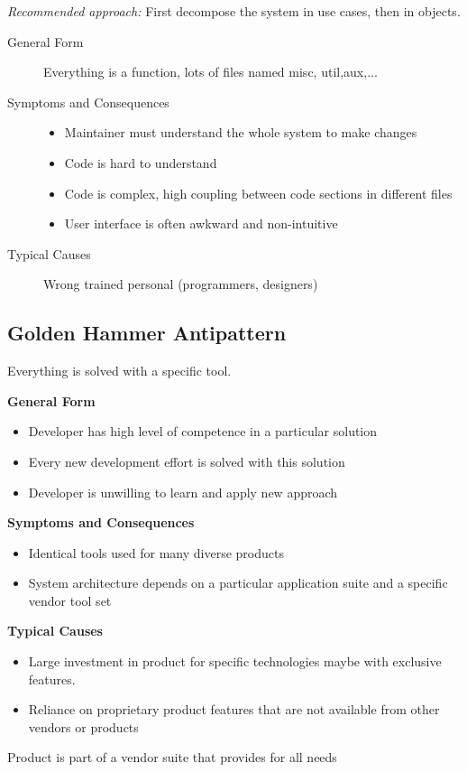 \textit{Recommended approach:} First decompose the system in use cases, then in objects.

\begin{description}
  \item[General Form] Everything is a function, lots of files named misc, util,aux,...
  \item[Symptoms and Consequences] \hfill
  \begin{itemize}
    \item Maintainer must understand the whole system to make changes
     \item Code is hard to understand
     \item Code is complex, high coupling between code sections in different files
     \item User interface is often awkward and non-intuitive
  \end{itemize}
  \item[Typical Causes] Wrong trained personal (programmers, designers)
\end{description}
\newpage

\subsection{Golden Hammer Antipattern}
Everything is solved with a specific tool.
\begin{description}
	\item \textbf{General Form}
	\begin{itemize}
		\item Developer has high level of competence in a particular solution
	    \item Every new development effort is solved with this solution
	    \item Developer is unwilling to learn and apply new approach
	\end{itemize}
	\item \textbf{Symptoms and Consequences}
	\begin{itemize}
	  	\item Identical tools used for many diverse products
	  	\item System architecture depends on a particular application suite and a
  	specific vendor tool set
	\end{itemize}
	\item \textbf{Typical Causes}
	\begin{itemize}
	  	\item Large investment in product for specific technologies maybe with exclusive features.
	  	\item Reliance on proprietary product features that are not available from
	  	other vendors or products
	\end{itemize}
	\item[Known Exceptions] Product is part of a vendor suite that provides for all needs
\end{description}
\newpage

